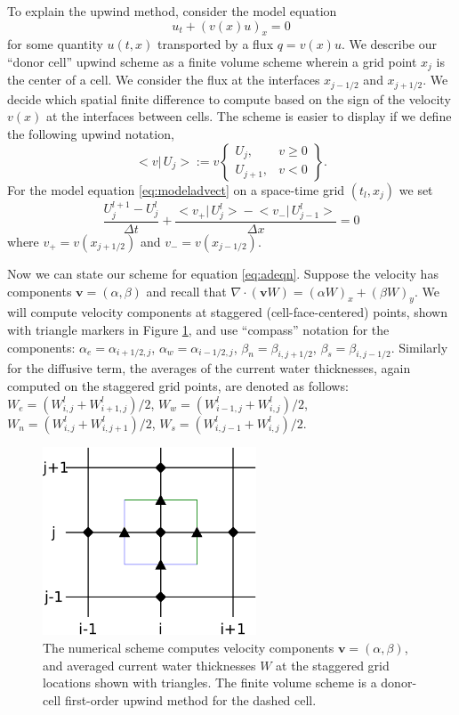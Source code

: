 \documentclass[12pt,final]{amsart}%
\newcommand\bv{\mathbf{v}}
\newcommand{\Div}{\nabla\cdot}
\begin{document}
To explain the upwind method, consider the model equation
\begin{equation} \label{eq:modeladvect}
u_t + (v(x) u)_x = 0
\end{equation}
for some quantity $u(t,x)$ transported by a flux $q = v(x) u$.  We describe our ``donor cell'' upwind scheme as a finite volume scheme \citep{LeVeque} wherein a grid point $x_j$ is the center of a cell.  We consider the flux at the interfaces $x_{j-1/2}$ and $x_{j+1/2}$.  We decide which spatial finite difference to compute based on the sign of the velocity $v(x)$ at the interfaces between cells.  The scheme is easier to display if we define the following upwind notation,
\newcommand{\up}[2]{\big<#1\big|\,#2\big>}
	$$\up{v}{U_j} := v \begin{Bmatrix} U_j, & v \ge 0 \\ U_{j+1}, & v < 0 \end{Bmatrix}.$$
For the model equation \eqref{eq:modeladvect} on a space-time grid $(t_l,x_j)$ we set
\begin{equation}\label{eq:modelfdadvect}
\frac{U_j^{l+1} - U_j^l}{\Delta t} + \frac{\up{v_+}{U_j^l} - \up{v_-}{U_{j-1}^l}}{\Delta x} = 0
\end{equation}
where $v_+ = v(x_{j+1/2})$ and $v_-=v(x_{j-1/2})$.

Now we can state our scheme for equation \eqref{eq:adeqn}.  Suppose the velocity has components $\bv = (\alpha,\beta)$ and recall that $\Div \left(\bv W\right) = (\alpha W)_x + (\beta W)_y$.  We will compute velocity components at staggered (cell-face-centered) points, shown with triangle markers in Figure \ref{fig:stencil}, and use ``compass'' notation for the components: $\alpha_e = \alpha_{i+1/2,j}$, $\alpha_w = \alpha_{i-1/2,j}$, $\beta_n = \beta_{i,j+1/2}$, $\beta_s = \beta_{i,j-1/2}$.  Similarly for the diffusive term, the averages of the current water thicknesses, again computed on the staggered grid points, are denoted as follows: $W_e = (W_{i,j}^l + W_{i+1,j}^l)/2$, $W_w = (W_{i-1,j}^l + W_{i,j}^l)/2$, $W_n = (W_{i,j}^l + W_{i,j+1}^l)/2$, $W_s = (W_{i,j-1}^l + W_{i,j}^l)/2$.

\begin{figure}[ht]
\centering
\includegraphics[width=2.5in,keepaspectratio=true]{diffstencil}
\bigskip
\caption{
The numerical scheme computes velocity components $\bv=(\alpha,\beta)$, and averaged current water thicknesses $W$ at the staggered grid locations shown with triangles.  The finite volume scheme is a donor-cell first-order upwind method for the dashed cell.}
\label{fig:stencil}
\end{figure}
\end{document}
